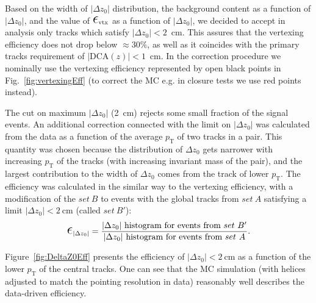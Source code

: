 Based on the width of $|\Delta z_{0}|$ distribution, the background content as a function of $|\Delta z_{0}|$, and the value of $\mbox{\LARGE$\epsilon$}_{\text{vtx}}$ as a function of $|\Delta z_{0}|$, we decided to accept in analysis only tracks which satisfy $|\Delta z_{0}|<2$~cm. This assures that the vertexing efficiency does not drop below $\approx 30\%$, as well as it coincides with the primary tracks requirement of $|\text{DCA}(z)|<1$~cm. In the correction procedure we nominally use the vertexing efficiency represented by open black points in Fig.~\ref{fig:vertexingEff} (to correct the MC e.g. in closure tests we use red points instead).

The cut on maximum $|\Delta z_{0}|$ (2~cm) rejects some small fraction of the signal events. An additional correction connected with the limit on $|\Delta z_{0}|$ was calculated from the data as a function of the average $p_{\text{T}}$ of two tracks in a pair. This quantity was chosen because the distribution of $\Delta z_{0}$ gets narrower with increasing $p_{\text{T}}$ of the tracks (with increasing invariant mass of the pair), and the largest contribution to the width of $\Delta z_{0}$ comes from the track of lower $p_{\text{T}}$. The efficiency was calculated in the similar way to the vertexing efficiency, with a modification of the $set~B$ to events with the global tracks from $set~A$ satisfying a limit $|\Delta z_{0}|<2~\text{cm}$ (called $set~B'$):
	\begin{equation}\label{eq:deltaZ0EffDef}
\mbox{\LARGE$\epsilon$}_{|\Delta z_{0}|} = \frac{|\Delta z_{0}|~\text{histogram for events from}~set~B'}{|\Delta z_{0}|~\text{histogram for events from}~set~A}.
\end{equation}

Figure~\ref{fig:DeltaZ0Eff} presents the efficiency of $|\Delta z_{0}|<2~\text{cm}$ as a function of the lower $p_{\text{T}}$ of the central tracks. One can see that the MC simulation (with helices adjusted to match the pointing resolution in data) reasonably well describes the data-driven efficiency.

